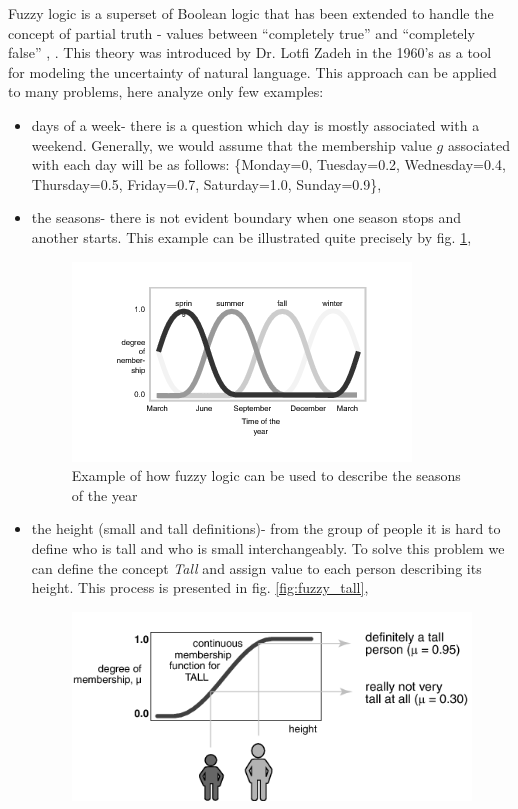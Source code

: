 Fuzzy logic is a superset of Boolean logic that 
has been extended to handle the concept of partial truth - values between ``completely 
true'' and ``completely false'' \cite{bib6}, \cite{bib12}. This theory was introduced by 
Dr. Lotfi Zadeh in the 1960's as a tool for modeling the uncertainty of natural language. 
This approach can be applied to many problems, here analyze only few examples:
\begin{itemize}
    \item days of a week- there is a question which day is mostly associated
        with a weekend. Generally, we would assume that the membership value
        $g$ associated with each day will be as follows:
        \{Monday=0, Tuesday=0.2, Wednesday=0.4, Thursday=0.5, Friday=0.7,
        Saturday=1.0, Sunday=0.9\},
    \item the seasons- there is not evident boundary when one season stops and
        another starts. This example can be illustrated quite precisely by fig.
        \ref{fig:seasons},
        \begin{figure}[H]
            \begin{center}
                \includegraphics{fig/seasons.png}
            \end{center}
            \caption{Example of how fuzzy logic can be used to describe the
            seasons of the year}
            \label{fig:seasons}
        \end{figure}
    \item the height (small and tall definitions)- from the group of people it
        is hard to define who is tall and who is small interchangeably. To
        solve this problem we can define the concept \textit{Tall} and assign
        value to each person describing its height. This process is presented in
        fig. \ref{fig:fuzzy_tall},
        \begin{figure}[H]
            \begin{center}
                \includegraphics{fig/fuzzy_tall.png}

\end{center}
\end{figure}
\end{itemize}
